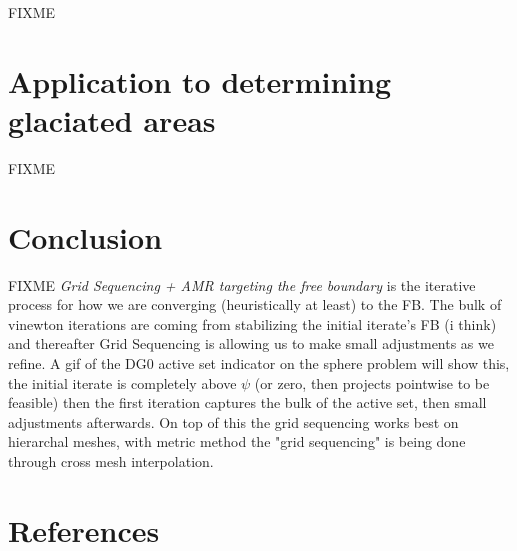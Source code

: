 \documentclass[]{interact}
\theoremstyle{plain}%
\theoremstyle{definition}
\theoremstyle{remark}
\begin{document}
FIXME


\section{Application to determining glaciated areas} \label{sec:app}

FIXME


\section{Conclusion} \label{sec:conclusion}

FIXME \emph{Grid Sequencing + AMR targeting the free boundary} is the iterative process for how we are converging (heuristically at least) to the FB.  The bulk of vinewton iterations are coming from stabilizing the initial iterate's FB (i think) and thereafter Grid Sequencing is allowing us to make small adjustments as we refine.  A gif of the DG0 active set indicator on the sphere problem will show this, the initial iterate is completely above $\psi$ (or zero, then  projects pointwise to be feasible) then the first iteration captures the bulk of the active set, then small adjustments afterwards. On top of this the grid sequencing works best on hierarchal meshes, with metric method  the "grid sequencing" is being done through cross mesh interpolation.





\section{References}





\end{document}
